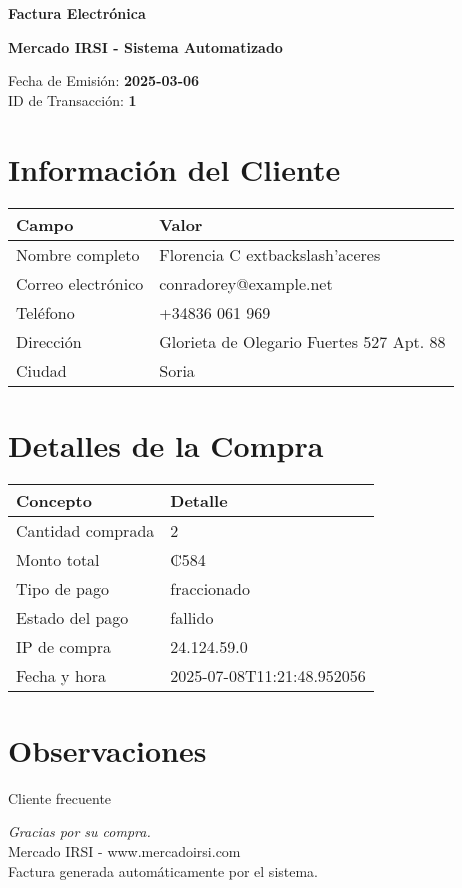 \documentclass[10pt]{article}
\begin{document}
\begin{center}
    \Huge \textbf{Factura Electrónica}

    \vspace{0.3cm}
    \large \textbf{Mercado IRSI - Sistema Automatizado}

    \vspace{0.5cm}
    \normalsize Fecha de Emisión: \textbf{2025-03-06} \\
    ID de Transacción: \textbf{1} \\
\end{center}

\vspace{1cm}

\section*{Información del Cliente}
\begin{tabularx}{\textwidth}{>{\raggedright\arraybackslash}p{4cm} X}
\rowcolor{lightgray}
\textbf{Campo} & \textbf{Valor} \\
\hline
Nombre completo & Florencia C	extbackslash{}'{a}ceres \\
Correo electrónico & conradorey@example.net \\
Teléfono & +34836 061 969 \\
Dirección & Glorieta de Olegario Fuertes 527 Apt. 88  \\
Ciudad & Soria \\
\end{tabularx}

\vspace{0.8cm}

\section*{Detalles de la Compra}
\begin{tabularx}{\textwidth}{>{\raggedright\arraybackslash}p{6cm} X}
\rowcolor{lightgray}
\textbf{Concepto} & \textbf{Detalle} \\
\hline
Cantidad comprada & 2 \\
Monto total & ₡584 \\
Tipo de pago & fraccionado \\
Estado del pago & fallido \\
IP de compra & 24.124.59.0 \\
Fecha y hora & 2025-07-08T11:21:48.952056 \\
\end{tabularx}

\vspace{1.5cm}

\section*{Observaciones}
Cliente frecuente

\vfill

\begin{center}
    \textit{Gracias por su compra.} \\
    Mercado IRSI - www.mercadoirsi.com \\
    Factura generada automáticamente por el sistema.
\end{center}
\end{document}
